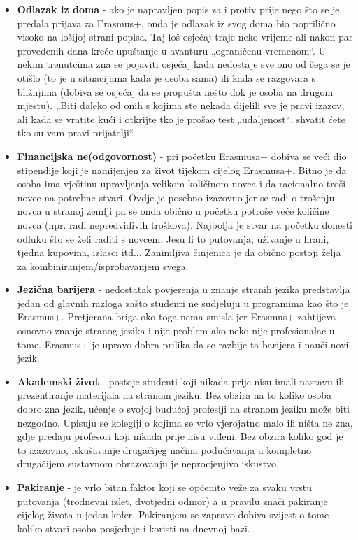 \documentclass[]{foi}
\begin{document}
\begin{itemize}
    \item \textbf{Odlazak iz doma} - ako je napravljen popis za i protiv prije nego što se je predala prijava za Erasmus+, onda je odlazak iz svog doma bio poprilično visoko na lošijoj strani 
    popisa. Taj loš osjećaj traje neko vrijeme ali nakon par provedenih dana kreće upuštanje u avanturu „ograničenu vremenom“. U nekim trenutcima zna se pojaviti osjećaj kada nedostaje sve ono od čega 
    se je otišlo (to je u situacijama kada je osoba sama) ili kada se razgovara s bližnjima (dobiva se osjećaj da se propušta nešto dok je osoba na drugom mjestu). 
    „Biti daleko od onih s kojima ste nekada dijelili sve je pravi izazov, ali kada se vratite kući i otkrijte tko je prošao test „udaljenost“, 
    shvatit ćete tko su vam pravi prijatelji“.
    \item \textbf{Financijska ne(odgovornost)} - pri početku Erasmusa+ dobiva se veći dio stipendije koji je namijenjen za život tijekom cijelog Erasmusa+. Bitno je da osoba ima vještinu 
    upravljanja velikom količinom novca i da racionalno troši novce na potrebne stvari. Ovdje je posebno izazovno jer se radi o trošenju novca u stranoj zemlji pa se onda obično u početku 
    potroše veće količine novca (npr. radi nepredvidivih troškova). Najbolja je stvar na početku donesti odluku što se želi raditi s novcem. Jesu li to putovanja, uživanje u hrani,
    tjedna kupovina, izlasci itd... Zanimljiva činjenica je da obično postoji želja za kombiniranjem/isprobavanjem svega.
    \item \textbf{Jezična barijera} - nedostatak povjerenja u znanje stranih jezika predstavlja jedan od glavnih razloga zašto studenti ne sudjeluju u programima kao što je Erasmus+. 
    Pretjerana briga oko toga nema smisla jer Erasmus+ zahtijeva osnovno znanje stranog jezika i nije problem ako neko nije profesionalac u tome. Erasmus+ je upravo dobra prilika da se razbije 
    ta barijera i nauči novi jezik.
    \item \textbf{Akademski život} - postoje studenti koji nikada prije nisu imali nastavu ili prezentiranje materijala na stranom jeziku. Bez obzira na to koliko osoba dobro zna jezik, 
    učenje o svojoj budućoj profesiji na stranom jeziku može biti nezgodno. Upisuju se kolegiji o kojima se vrlo vjerojatno malo ili ništa ne zna, gdje predaju profesori koji nikada prije 
    nisu viđeni. Bez obzira koliko god je to izazovno, iskušavanje drugačijeg načina podučavanja u kompletno drugačijem sustavnom obrazovanju je neprocjenjivo iskustvo.
    \item \textbf{Pakiranje} - je vrlo bitan faktor koji se općenito veže za svaku vrstu putovanja (trodnevni izlet, dvotjedni odmor) a u pravilu znači pakiranje cijelog života u jedan kofer. 
    Pakiranjem se zapravo dobiva svijest o tome koliko stvari osoba posjeduje i koristi na dnevnoj bazi. 
    
\end{itemize}
\end{document}
